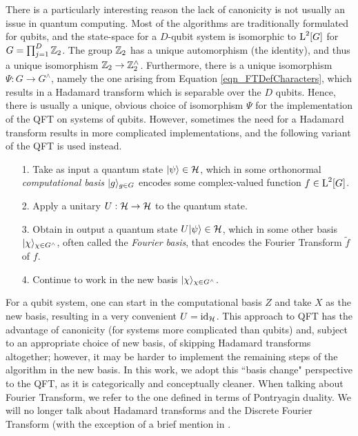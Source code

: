 There is a particularly interesting reason the lack of canonicity is not usually an issue in quantum computing. Most of the algorithms are traditionally formulated for qubits, and the state-space for a $D$-qubit system is isomorphic to $\operatorname{L}^2[G]$ for $G = \prod_{j=1}^D \mathbb{Z}_{2}$. The group $\mathbb{Z}_{2}$ has a unique automorphism (the identity), and thus a unique isomorphism $\mathbb{Z}_{2} \rightarrow \mathbb{Z}_{2}^\wedge$. Furthermore, there is a unique isomorphism $\Psi : G \rightarrow G^\wedge$, namely the one arising from Equation \ref{eqn_FTDefCharacters}, which results in a Hadamard transform which is separable over the $D$ qubits. Hence, there is usually a unique, obvious choice of isomorphism $\Psi$ for the implementation of the QFT on systems of qubits. However, sometimes the need for a Hadamard transform results in more complicated implementations, and the following variant of the QFT is used instead.
\begin{enumerate}
  \item[1.] Take as input a quantum state $| \psi \rangle \in  \mathcal{H}$, which in some orthonormal \textit{computational basis} $| g \rangle_{g\in G}$ encodes some complex-valued function $f \in \operatorname{L}^2[G]$.
  \item[2.] Apply a unitary $U : \mathcal{H} \rightarrow \mathcal{H}$ to the quantum state.
  \item[3.] Obtain in output a quantum state $U| \psi \rangle \in \mathcal{H}$, which in some other basis $| \chi \rangle_{\chi\in G^\wedge}$, often called the \emph{Fourier basis}, that encodes the Fourier Transform $\tilde{f}$ of $f$.
  \item[4.] Continue to work in the new basis $| \chi \rangle_{\chi\in G^\wedge}$.
\end{enumerate}

For a qubit system, one can start in the computational basis $Z$ and take $X$ as the new basis, resulting in a very convenient $U = \mbox{id}_{\mathcal{H}}$. This approach to QFT has the advantage of canonicity (for systems more complicated than qubits) and, subject to an appropriate choice of new basis, of skipping Hadamard transforms altogether; however, it may be harder to implement the remaining steps of the algorithm in the new basis. In this work, we  adopt this ``basis change" perspective to the QFT, as it is categorically and conceptually cleaner. When talking about Fourier Transform, we refer to the one defined in terms of Pontryagin duality. We will no longer talk about Hadamard transforms and the Discrete Fourier Transform (with the exception of a brief mention in .

